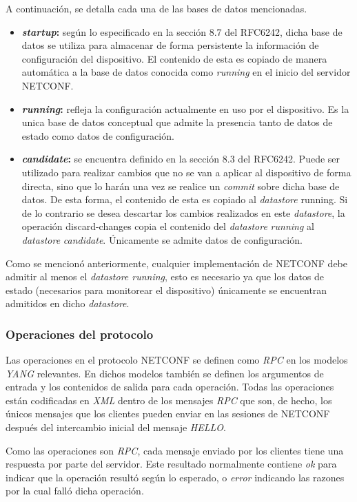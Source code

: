   A continuación, se detalla cada una de las bases de datos mencionadas.
\begin{itemize}
	\item \textbf{\textit{startup}:} según lo especificado en la sección 8.7 del RFC6242, dicha base de datos se utiliza para almacenar de forma persistente la información de configuración del dispositivo. El contenido de esta es copiado de manera automática a la base de datos conocida como \textit{running} en el inicio del servidor NETCONF. 
	\item \textbf{\textit{running}:} refleja la configuración actualmente en uso por el dispositivo. Es la unica base de datos conceptual que admite la presencia tanto de datos de estado como datos de configuración. 
	\item \textbf{\textit{candidate}:} se encuentra definido en la sección 8.3 del RFC6242. Puede ser utilizado para realizar cambios que no se van a aplicar al dispositivo de forma directa, sino que lo harán una vez se realice un \textit{commit} sobre dicha base de datos. De esta forma, el contenido de esta es copiado al \textit{datastore} running. Si de lo contrario se desea descartar los cambios realizados en este \textit{datastore}, la operación discard-changes copia el contenido del \textit{datastore} \textit{running} al \textit{datastore} \textit{candidate}. Únicamente se admite datos de configuración.
\end{itemize}


Como se mencionó anteriormente, cualquier implementación de NETCONF debe admitir al menos el \textit{datastore running}, esto es necesario ya que los datos de estado (necesarios para monitorear el dispositivo) únicamente se encuentran admitidos en dicho \textit{datastore}.

\subsubsection{Operaciones del protocolo}

Las operaciones en el protocolo NETCONF se definen como \textit{RPC} en los modelos \textit{YANG} relevantes. En dichos modelos también se definen los argumentos de entrada y los contenidos de salida para cada operación. Todas las operaciones están codificadas en \textit{XML} dentro de los mensajes \textit{RPC} que son, de hecho, los únicos mensajes que los clientes pueden enviar en las sesiones de NETCONF después del intercambio inicial del mensaje \textit{HELLO}. 

Como las operaciones son \textit{RPC}, cada mensaje enviado por los clientes tiene una respuesta por parte del servidor. Este resultado normalmente contiene \textit{ok} para indicar que la operación resultó según lo esperado, o \textit{error} indicando las razones por la cual falló dicha operación.
\\

